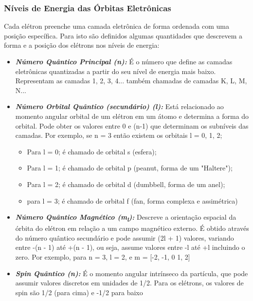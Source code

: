 \documentclass[11pt,a4paper]{article}
\newcounter{exemplo}
\begin{document}
\subsubsection*{Níveis de Energia das Órbitas Eletrônicas}

	Cada elétron preenche uma camada eletrônica de forma ordenada com uma posição específica. Para isto são definidos algumas quantidades que descrevem a forma e a posição dos elétrons nos níveis de energia:

    \begin{itemize}
		\item \textbf{\textit{\textcolor{CarnationPink}{Número Quântico Principal (n):}}} É o número que define as camadas eletrônicas quantizadas a partir do seu nível de energia mais baixo. Representam as camadas 1, 2, 3, 4... também chamadas de camadas K, L, M, N... 
		\item \textbf{\textit{\textcolor{CarnationPink}{Número Orbital Quântico (secundário) (l):}}} Está relacionado ao momento angular orbital de um elétron em um átomo e determina a forma do orbital. Pode obter os valores entre 0 e (n-1) que determinam os subníveis das camadas. Por exemplo, se n = 3 então existem os orbitais l = 0, 1, 2;
			\begin{itemize}
				\item Para l = 0; é chamado de orbital s (esfera);
				\item Para l = 1; é chamado de orbital p (peanut, forma de um "Haltere");
				\item Para l = 2; é chamado de orbital d (dumbbell, forma de um anel);
				\item para l = 3; é chamado de orbital f (fan, forma complexa e assimétrica) 
			\end{itemize}
		\item \textbf{\textit{\textcolor{CarnationPink}{Número Quântico Magnético (m\textsubscript{l}):}}} Descreve a orientação espacial da órbita do elétron em relação a um campo magnético externo. É obtido através do número quântico secundário e pode assumir (2l + 1) valores, variando entre -(n - 1) até +(n - 1), ou seja, assume valores entre -l até +l incluindo o zero. Por exemplo, para n = 3, l = 2, e m = [-2, -1, 0 1, 2]
		\item \textbf{\textit{\textcolor{CarnationPink}{Spin Quântico (n):}}} É o momento angular intrínseco da partícula, que pode assumir valores discretos em unidades de 1/2. Para os elétrons, os valores de spin são 1/2 (para cima) e -1/2 para baixo
	\end{itemize}            
\end{document}
